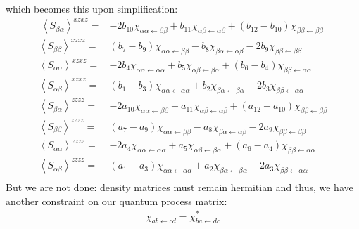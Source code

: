 which becomes this upon simplification:
\begin{align*}\
	\left \langle S_{\beta \alpha} \right \rangle^{xzxz} =& - 2 b_{10} \chi_{ \alpha \alpha \leftarrow \beta \beta}   + b_{11} \chi_{ \alpha  \beta\leftarrow \alpha \beta } +\left(  b_{12} - b_{10} \right) \chi_{ \beta \beta \leftarrow \beta \beta } \\
	\left \langle S_{\beta \beta} \right \rangle^{xzxz} =&  \left( b_7 - b_9 \right)   \chi_{ \alpha \alpha \leftarrow \beta \beta } - b_8 \chi_{\beta  \alpha \leftarrow \alpha \beta } - 2 b_9  \chi_{ \beta \beta \leftarrow \beta \beta} \\
	\left \langle S_{\alpha \alpha} \right \rangle^{xzxz} =& -2  b_4 \chi_{ \alpha \alpha \leftarrow \alpha \alpha}  + b_5 \chi_{\alpha \beta \leftarrow \beta \alpha} + \left( b_6 - b_4 \right) \chi_{\beta \beta \leftarrow \alpha \alpha} \\
	\left \langle S_{\alpha \beta} \right \rangle^{xzxz} =&  \left( b_1 - b_3 \right)  \chi_{\alpha \alpha \leftarrow \alpha \alpha} + b_2 \chi_{\beta \alpha \leftarrow \beta \alpha} - 2 b_3  \chi_{\beta \beta \leftarrow \alpha \alpha}  \\
	\left \langle S_{\beta \alpha} \right \rangle^{zzzz} =& - 2 a_{10} \chi_{ \alpha \alpha \leftarrow \beta \beta}   + a_{11} \chi_{ \alpha  \beta\leftarrow \alpha \beta } +\left(  a_{12} - a_{10} \right) \chi_{ \beta \beta \leftarrow \beta \beta } \\
	\left \langle S_{\beta \beta} \right \rangle^{zzzz} =&  \left( a_7 - a_9 \right)   \chi_{ \alpha \alpha \leftarrow \beta \beta } - a_8 \chi_{\beta  \alpha \leftarrow \alpha \beta } - 2 a_9  \chi_{ \beta \beta \leftarrow \beta \beta} \\
	\left \langle S_{\alpha \alpha} \right \rangle^{zzzz} =& -2  a_4 \chi_{ \alpha \alpha \leftarrow \alpha \alpha}  + a_5 \chi_{\alpha \beta \leftarrow \beta \alpha} + \left( a_6 - a_4 \right) \chi_{\beta \beta \leftarrow \alpha \alpha} \\
	\left \langle S_{\alpha \beta} \right \rangle^{zzzz} =&  \left( a_1 - a_3 \right)  \chi_{\alpha \alpha \leftarrow \alpha \alpha} + a_2 \chi_{\beta \alpha \leftarrow \beta \alpha} - 2 a_3  \chi_{\beta \beta \leftarrow \alpha \alpha}  \\
\end{align*}
But we are not done: density matrices must remain hermitian and thus, we have another constraint on our quantum process matrix:
\begin{align*}
	\chi_{a b \leftarrow c d} = \chi_{ b a \leftarrow d c}^{*}
\end{align*}
